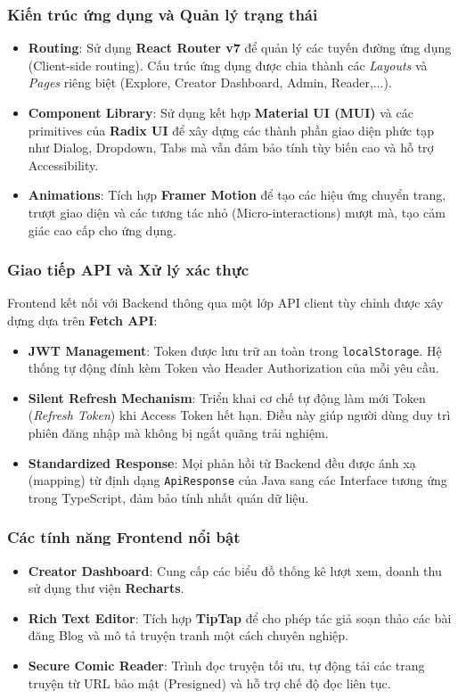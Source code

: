 \subsubsection{Kiến trúc ứng dụng và Quản lý trạng thái}
\begin{itemize}
    \item \textbf{Routing}: Sử dụng \textbf{React Router v7} để quản lý các tuyến đường ứng dụng (Client-side routing). Cấu trúc ứng dụng được chia thành các \textit{Layouts} và \textit{Pages} riêng biệt (Explore, Creator Dashboard, Admin, Reader,...).
    \item \textbf{Component Library}: Sử dụng kết hợp \textbf{Material UI (MUI)} và các primitives của \textbf{Radix UI} để xây dựng các thành phần giao diện phức tạp như Dialog, Dropdown, Tabs mà vẫn đảm bảo tính tùy biến cao và hỗ trợ Accessibility.
    \item \textbf{Animations}: Tích hợp \textbf{Framer Motion} để tạo các hiệu ứng chuyển trang, trượt giao diện và các tương tác nhỏ (Micro-interactions) mượt mà, tạo cảm giác cao cấp cho ứng dụng.
\end{itemize}

\subsubsection{Giao tiếp API và Xử lý xác thực}
Frontend kết nối với Backend thông qua một lớp API client tùy chỉnh được xây dựng dựa trên \textbf{Fetch API}:
\begin{itemize}
    \item \textbf{JWT Management}: Token được lưu trữ an toàn trong \texttt{localStorage}. Hệ thống tự động đính kèm Token vào Header Authorization của mỗi yêu cầu.
    \item \textbf{Silent Refresh Mechanism}: Triển khai cơ chế tự động làm mới Token (\textit{Refresh Token}) khi Access Token hết hạn. Điều này giúp người dùng duy trì phiên đăng nhập mà không bị ngắt quãng trải nghiệm.
    \item \textbf{Standardized Response}: Mọi phản hồi từ Backend đều được ánh xạ (mapping) từ định dạng \texttt{ApiResponse} của Java sang các Interface tương ứng trong TypeScript, đảm bảo tính nhất quán dữ liệu.
\end{itemize}

\subsubsection{Các tính năng Frontend nổi bật}
\begin{itemize}
    \item \textbf{Creator Dashboard}: Cung cấp các biểu đồ thống kê lượt xem, doanh thu sử dụng thư viện \textbf{Recharts}.
    \item \textbf{Rich Text Editor}: Tích hợp \textbf{TipTap} để cho phép tác giả soạn thảo các bài đăng Blog và mô tả truyện tranh một cách chuyên nghiệp.
    \item \textbf{Secure Comic Reader}: Trình đọc truyện tối ưu, tự động tải các trang truyện từ URL bảo mật (Presigned) và hỗ trợ chế độ đọc liên tục.
\end{itemize}

